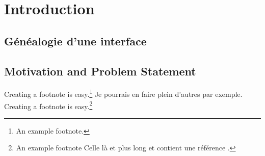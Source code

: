 %
\chapter{Introduction}
\label{ch:introduction}


\Blindtext[2][2]

\section{Généalogie d'une interface}
\label{sec:introduction:address}


\section{Motivation and Problem Statement}
\label{sec:intro:motivation}

\Blindtext[3][1] \cite{Jurgens:2000,Jurgens:1995,Miede:2011,Kohm:2011}

\cite{WEB:Bacal:2009}

Creating a footnote is easy.\footnote{An example footnote.} Je pourrais en faire plein d'autres par exemple.
Creating a footnote is easy.\footnote{An example footnote Celle là et plus long et contient une référence  \cite{Jurgens:2000}.}

